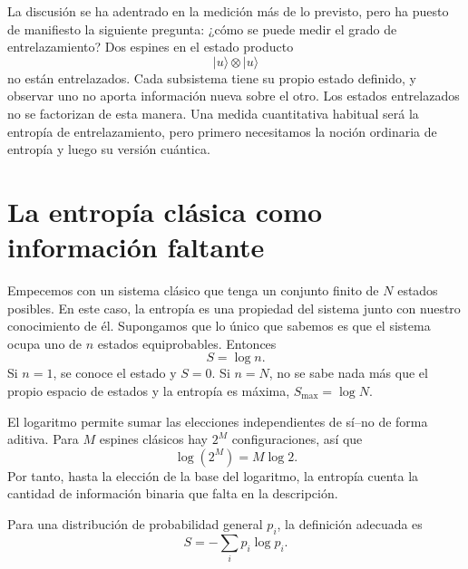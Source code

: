 La discusión se ha adentrado en la medición más de lo previsto, pero ha puesto de manifiesto la siguiente pregunta: ¿cómo se puede medir el grado de entrelazamiento? Dos espines en el estado producto
\begin{equation}
|u\rangle\otimes|u\rangle
\end{equation}
no están entrelazados. Cada subsistema tiene su propio estado definido, y observar uno no aporta información nueva sobre el otro. Los estados entrelazados no se factorizan de esta manera. Una medida cuantitativa habitual será la entropía de entrelazamiento, pero primero necesitamos la noción ordinaria de entropía y luego su versión cuántica.

\section{La entropía clásica como información faltante}

Empecemos con un sistema clásico que tenga un conjunto finito de \(N\) estados posibles. En este caso, la entropía es una propiedad del sistema junto con nuestro conocimiento de él. Supongamos que lo único que sabemos es que el sistema ocupa uno de \(n\) estados equiprobables. Entonces
\begin{equation}
S=\log n.
\end{equation}
Si \(n=1\), se conoce el estado y \(S=0\). Si \(n=N\), no se sabe nada más que el propio espacio de estados y la entropía es máxima, \(S_{\max}=\log N\).

El logaritmo permite sumar las elecciones independientes de sí--no de forma aditiva. Para \(M\) espines clásicos hay \(2^M\) configuraciones, así que
\begin{equation}
\log(2^M)=M\log 2.
\end{equation}
Por tanto, hasta la elección de la base del logaritmo, la entropía cuenta la cantidad de información binaria que falta en la descripción.

Para una distribución de probabilidad general \(p_i\), la definición adecuada es
\begin{equation}
S=-\sum_i p_i\log p_i.
\end{equation}

\begin{classroomqa}
\end{classroomqa}

